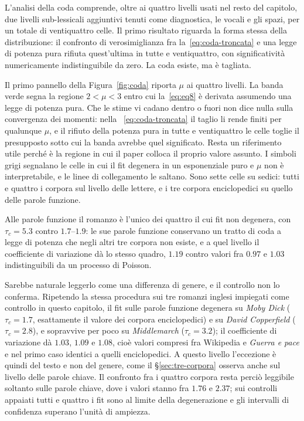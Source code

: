 L'analisi della coda comprende, oltre ai quattro livelli usati nel resto del
capitolo, due livelli sub-lessicali aggiuntivi tenuti come diagnostica, le
vocali e gli spazi, per un totale di ventiquattro celle. Il primo risultato
riguarda la forma stessa della distribuzione: il confronto di verosimiglianza
fra la~\eqref{eq:coda-troncata} e una legge di potenza pura rifiuta
quest'ultima in tutte e ventiquattro, con significatività numericamente
indistinguibile da zero. La coda esiste, ma è tagliata.

Il primo pannello della Figura~\ref{fig:coda} riporta $\mu$ ai quattro livelli.
La banda verde segna la regione $2 < \mu < 3$ entro cui la~\eqref{eq:eq8} è
derivata assumendo una legge di potenza pura. Che le stime vi cadano dentro o
fuori non dice nulla sulla convergenza dei momenti: nella
~\eqref{eq:coda-troncata} il taglio li rende finiti per qualunque $\mu$, e il
rifiuto della potenza pura in tutte e ventiquattro le celle toglie il
presupposto sotto cui la banda avrebbe quel significato. Resta un riferimento
utile perché è la regione in cui il paper colloca il proprio valore assunto.
I simboli grigi segnalano le celle in cui il fit degenera in un
esponenziale puro e $\mu$ non è interpretabile, e le linee di collegamento le
saltano. Sono sette celle su sedici: tutti e quattro i corpora sul livello delle
lettere, e i tre corpora enciclopedici su quello delle parole funzione.

Alle parole funzione il romanzo è l'unico dei quattro il cui fit non degenera,
con $\tau_c = 5.3$ contro $1.7$--$1.9$: le sue parole funzione conservano un
tratto di coda a legge di potenza che negli altri tre corpora non esiste, e a
quel livello il coefficiente di variazione dà lo stesso quadro, $1.19$ contro
valori fra $0.97$ e $1.03$ indistinguibili da un processo di Poisson.

Sarebbe naturale leggerlo come una differenza di genere, e il controllo non lo
conferma. Ripetendo la stessa procedura sui tre romanzi inglesi impiegati come
controllo in questo capitolo, il fit sulle parole funzione degenera su
\emph{Moby Dick} ($\tau_c = 1.7$, esattamente il valore dei corpora
enciclopedici) e su \emph{David Copperfield} ($\tau_c = 2.8$), e sopravvive per
poco su \emph{Middlemarch} ($\tau_c = 3.2$); il coefficiente di variazione dà
$1.03$, $1.09$ e $1.08$, cioè valori compresi fra Wikipedia e
\emph{Guerra e pace} e nel primo caso identici a quelli enciclopedici. A questo
livello l'eccezione è quindi del testo e non del genere, come il
§\ref{sec:tre-corpora} osserva anche sul livello delle parole chiave. Il confronto fra i quattro
corpora resta perciò leggibile soltanto sulle parole chiave, dove i valori
stanno fra $1.76$ e $2.37$; sui controlli appaiati tutti e quattro i fit sono al
limite della degenerazione e gli intervalli di confidenza superano l'unità di
ampiezza.

